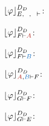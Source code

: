 \begin{example}
\begin{multicols}{3}
{$\projectionDDefinitional{\varphi}{E, \hD{A}, \hC{B} \seq }$:
\begin{small}
\begin{prooftree}
 
		 
		 
	 
\end{prooftree}
\end{small}
}
\end{multicols}




\begin{multicols}{3}{
$\projectionDDefinitional{\varphi}{F \seq \hA{A}}$:
\begin{prooftree}
 
 
 
\end{prooftree}

$\projectionDDefinitional{\varphi}{F \seq \hB{B}}$:
\begin{prooftree}
 
 
 
\end{prooftree}

$\projectionDDefinitional{\varphi}{\hA{A}, \hB{B} \seq F}$:
\begin{prooftree}
		 
	 
\end{prooftree}
}
\end{multicols}





\begin{multicols}{3}{
$\projectionDDefinitional{\varphi}{G \seq F}$:
\begin{prooftree}
 
 
 
\end{prooftree}

$\projectionDDefinitional{\varphi}{G \seq E}$:
\begin{prooftree}
 
 
 
\end{prooftree}

}
\end{multicols}
\end{example}
